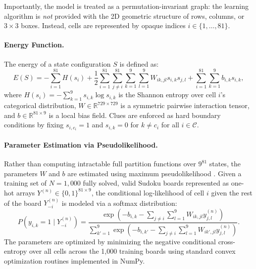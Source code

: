 \documentclass{article} %
\begin{document}
Importantly, the model is treated as a permutation-invariant graph: the learning algorithm is \textit{not} provided with the 2D geometric structure of rows, columns, or $3 \times 3$ boxes. Instead, cells are represented by opaque indices $i \in \{1, \dots, 81\}$.

\paragraph{Energy Function.}
The energy of a state configuration $S$ is defined as:
\begin{equation}
    \label{eq:energy}
    E(S) = -\sum_{i=1}^{81} H(s_i) + \frac{1}{2} \sum_{i=1}^{81} \sum_{j \neq i}^{81} \sum_{k=1}^9 \sum_{l=1}^9 W_{ik, jl} s_{i,k} s_{j,l} + \sum_{i=1}^{81} \sum_{k=1}^9 b_{i,k} s_{i,k},
\end{equation}
where $H(s_i) = -\sum_{k=1}^9 s_{i,k} \log s_{i,k}$ is the Shannon entropy over cell $i$'s categorical distribution, $W \in \mathbb{R}^{729 \times 729}$ is a symmetric pairwise interaction tensor, and $b \in \mathbb{R}^{81 \times 9}$ is a local bias field. Clues are enforced as hard boundary conditions by fixing $s_{i,c_i} = 1$ and $s_{i,k} = 0$ for $k \neq c_i$ for all $i \in \mathcal{C}$.

\paragraph{Parameter Estimation via Pseudolikelihood.}
Rather than computing intractable full partition functions over $9^{81}$ states, the parameters $W$ and $b$ are estimated using maximum pseudolikelihood \citep{besag1974spatial}. Given a training set of $N = 1{,}000$ fully solved, valid Sudoku boards represented as one-hot arrays $Y^{(n)} \in \{0, 1\}^{81 \times 9}$, the conditional log-likelihood of cell $i$ given the rest of the board $Y_{-i}^{(n)}$ is modeled via a softmax distribution:
\begin{equation}
    P(y_{i,k} = 1 \mid Y_{-i}^{(n)}) = \frac{\exp\left( -b_{i,k} - \sum_{j \neq i} \sum_{l=1}^9 W_{ik, jl} y_{j,l}^{(n)} \right)}{\sum_{k'=1}^9 \exp\left( -b_{i,k'} - \sum_{j \neq i} \sum_{l=1}^9 W_{ik', jl} y_{j,l}^{(n)} \right)}.
\end{equation}
The parameters are optimized by minimizing the negative conditional cross-entropy over all cells across the 1,000 training boards using standard convex optimization routines implemented in NumPy.
\end{document}
